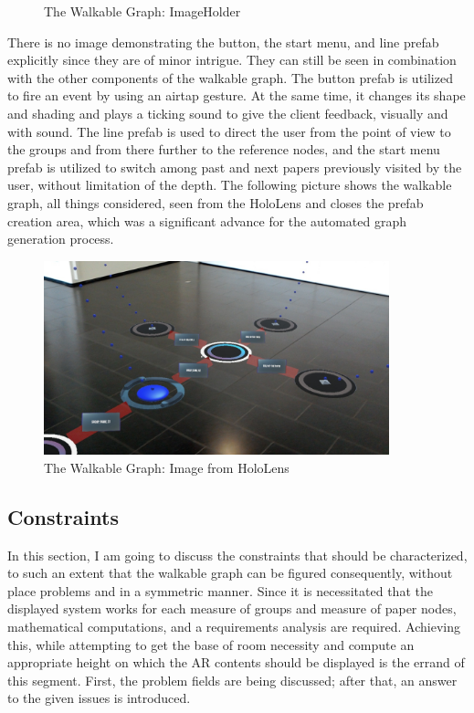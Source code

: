 \documentclass[12pt,a4paper,oneside,american,parskip=half]{article}
\begin{document}
\begin{justify}
\begin{normalsize}
\begin{figure}[h!]
\caption{The Walkable Graph: ImageHolder}
\end{figure}
There is no image demonstrating the button, the start menu, and line prefab explicitly since they are of minor intrigue. They can still be seen in combination with the other components of the walkable graph. The button prefab is utilized to fire an event by using an airtap gesture. At the same time, it changes its shape and shading and plays a ticking sound to give the client feedback, visually and with sound. 
\newline
The line prefab is used to direct the user from the point of view to the groups and from there further to the reference nodes, and the start menu prefab is utilized to switch among past and next papers previously visited by the user, without limitation of the depth.
\newline
The following picture shows the walkable graph, all things considered, seen from the HoloLens and closes the prefab creation area, which was a significant advance for the automated graph generation process.
\begin{figure}[h!]
\centering
\includegraphics[width= 10cm]{graph.jpg}
\caption{The Walkable Graph: Image from HoloLens}
\end{figure} \par

\subsection{Constraints}
In this section, I am going to discuss the constraints that should be characterized, to such an extent that the walkable graph can be figured consequently, without place problems and in a symmetric manner. Since it is necessitated that the displayed system works for each measure of groups and measure of paper nodes, mathematical computations, and a requirements analysis are required. 
Achieving this, while attempting to get the base of room necessity and compute an appropriate height on which the AR contents should be displayed is the errand of this segment.
\newline
First, the problem fields are being discussed; after that, an answer to the given issues is introduced.


\end{normalsize}
\end{justify}
\end{document}
